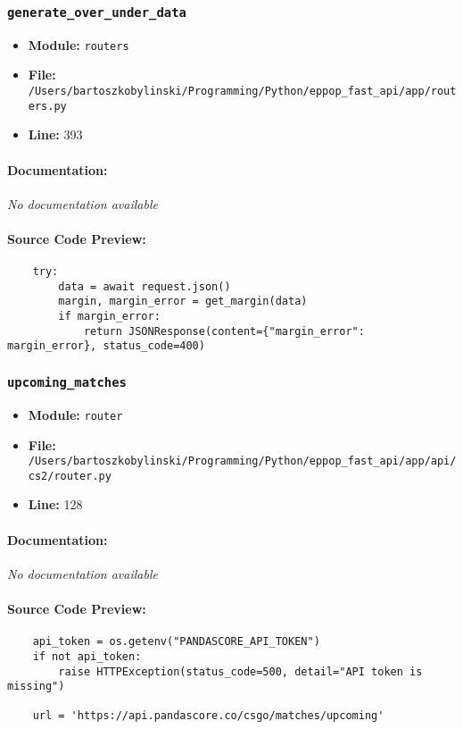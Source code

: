 \documentclass[11pt,a4paper]{article}
\begin{document}
\vspace{1em}
\subsubsection{\texttt{generate\_over\_under\_data}}

\begin{itemize}
    \item \textbf{Module:} \texttt{routers}
    \item \textbf{File:} \texttt{/Users/bartoszkobylinski/Programming/Python/eppop\_fast\_api/app/routers.py}
    \item \textbf{Line:} 393
\end{itemize}

\paragraph{Documentation:} \textit{No documentation available}

\paragraph{Source Code Preview:}
\begin{verbatim}
    try:
        data = await request.json()
        margin, margin_error = get_margin(data)
        if margin_error:
            return JSONResponse(content={"margin_error": margin_error}, status_code=400)
\end{verbatim}

\vspace{1em}
\subsubsection{\texttt{upcoming\_matches}}

\begin{itemize}
    \item \textbf{Module:} \texttt{router}
    \item \textbf{File:} \texttt{/Users/bartoszkobylinski/Programming/Python/eppop\_fast\_api/app/api/cs2/router.py}
    \item \textbf{Line:} 128
\end{itemize}

\paragraph{Documentation:} \textit{No documentation available}

\paragraph{Source Code Preview:}
\begin{verbatim}
    api_token = os.getenv("PANDASCORE_API_TOKEN")
    if not api_token:
        raise HTTPException(status_code=500, detail="API token is missing")

    url = 'https://api.pandascore.co/csgo/matches/upcoming'
\end{verbatim}
\end{document}
